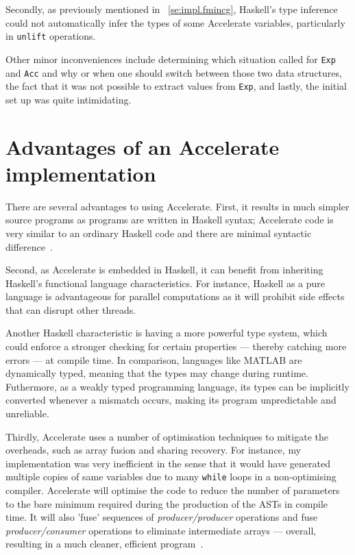 Secondly, as previously mentioned in ~\ref{se:impl.fmincg}, Haskell's type inference could not automatically infer the types of some Accelerate variables, particularly in \texttt{unlift} operations. 

Other minor inconveniences include determining which situation called for \texttt{Exp} and \texttt{Acc} and why or when one should switch between those two data structures, the fact that it was not possible to extract values from \texttt{Exp}, and lastly, the initial set up was quite intimidating.

\section{Advantages of an Accelerate implementation} \label{se:eval.advantages}

There are several advantages to using Accelerate. First, it results in much simpler source programs as programs are written in Haskell syntax; Accelerate code is very similar to an ordinary Haskell code and there are minimal syntactic difference~\cite{Mar13}.

Second, as Accelerate is embedded in Haskell, it can benefit from inheriting Haskell's functional language characteristics. For instance, Haskell as a pure language is advantageous for parallel computations as it will prohibit side effects that can disrupt other threads.

Another Haskell characteristic is having a more powerful type system, which could enforce a stronger checking for certain properties --- thereby catching more errors --- at compile time. In comparison, languages like MATLAB are dynamically typed, meaning that the types may change during runtime. Futhermore, as a weakly typed programming language, its types can be implicitly converted whenever a mismatch occurs, making its program unpredictable and unreliable.

Thirdly, Accelerate uses a number of optimisation techniques to mitigate the overheads, such as array fusion and sharing recovery\cite{ChaKelLee11}. For instance, my implementation was very inefficient in the sense that it would have generated multiple copies of same variables due to many \texttt{while} loops in a non-optimising compiler. Accelerate will optimise the code to reduce the number of parameters to the bare minimum required during the production of the ASTs in compile time. It will also 'fuse' sequences of \textit{producer/producer} operations and fuse \textit{producer/consumer} operations to eliminate intermediate arrays --- overall, resulting in a much cleaner, efficient program~\cite{McDChaGro}.

